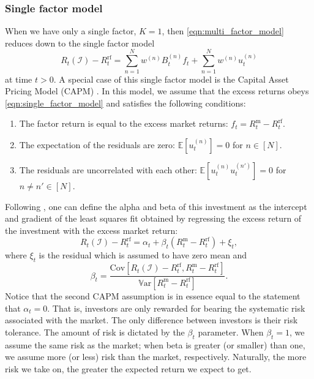 \documentclass[12pt]{article}
\begin{document}
\subsubsection{Single factor model}
When we have only a single factor, $K=1$, then \eqref{eqn:multi_factor_model} reduces down to the single factor model
\begin{equation}
	R_t(\mathcal{I}) - R^{\text{rf}}_t = \sum_{n=1}^N w^{(n)} B_t^{(n)} f_t + \sum_{n=1}^N w^{(n)} u^{(n)}_t
	\label{eqn:single_factor_model}
\end{equation}
at time $t>0$. A special case of this single factor model is the Capital Asset Pricing Model (CAPM) \citep{sharpe1964jf}. In this model, we assume that the excess returns obeys \eqref{eqn:single_factor_model} and satisfies the following conditions:
\begin{enumerate}
	\item The factor return is equal to the excess market returns: $f_t = R^{\text{m}}_t - R^{\text{rf}}_t$.
	\item The expectation of the residuals are zero: $\mathbb{E}[u^{(n)}_t] = 0$ for $n \in [N]$.
	\item The residuals are uncorrelated with each other: $\mathbb{E}[u^{(n)}_t u^{(n')}_t] = 0$ for $n \neq n' \in [N]$.
\end{enumerate}
Following \citet[Chapter 1]{grinold1999}, one can define the alpha and beta of this investment as the intercept and gradient of the least squares fit obtained by regressing the excess return of the investment with the excess market return:
\begin{equation}
	R_t(\mathcal{I}) - R^{\text{rf}}_t
	= \alpha_t + \beta_t (R^{\text{m}}_t - R^{\text{rf}}_t) + \xi_t,
\end{equation}
where $\xi_t$ is the residual which is assumed to have zero mean and 
\begin{equation}
	\beta_t = \frac{\text{Cov}[R_t(\mathcal{I}) - R^{\text{rf}}_t, R^{\text{m}}_t - R^{\text{rf}}_t]}{ \mathbb{V}\text{ar}[R^{\text{m}}_t - R^{\text{rf}}_t]}.
\end{equation} 
Notice that the second CAPM assumption is in essence equal to the statement that $\alpha_t = 0$. That is, investors are only rewarded for bearing the systematic risk associated with the market. The only difference between investors is their risk tolerance. The amount of risk is dictated by the $\beta_t$ parameter. When $\beta_t=1$, we assume the same risk as the market; when beta is greater (or smaller) than one, we assume more (or less) risk than the market, respectively. Naturally, the more risk we take on, the greater the expected return we expect to get. 
\end{document}
